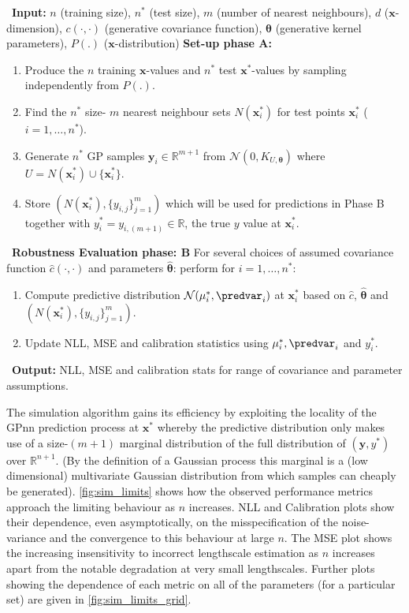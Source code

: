   \begin{algorithm}[ht]
     \,\,\,\textbf{Input:} $n$ (training size), $n^*$ (test size), $m$ (number of nearest neighbours), $d$ ($\bm{x}$-dimension), $c(\cdot,\cdot)$ (generative covariance function), $\bm{\theta}$ (generative kernel parameters), $P(.)$ ($\bm{x}$-distribution) 
     \newline
     \textbf{Set-up phase A:}
     \begin{enumerate}
       \item Produce the $n$ training $\bm{x}$-values and $n^*$ test $\bm{x}^*$-values by sampling independently from $P(.)$.
       \item Find the $n^*$ size- $m$ nearest neighbour sets $N(\bm{x}_i^*)$ for test points $\bm{x}_i^*$ ($i = 1,\dots,n^*$).
       \item Generate $n^*$ GP samples $\bm{y}_i \in \mathbb{R}^{m+1}$ from $\mathcal{N}(0,K_{U,\bm{\theta}})$ where
       $U = N(\bm{x}_i^*) \cup \{\bm{x}_i^*\}$.
       \item Store $(N(\bm{x}_i^*),\{y_{i,j}\}_{j=1}^m)$ which will be used for predictions in Phase B together with $y_i^* = y_{i,(m+1)} \in \mathbb{R}$, the true $y$ value at $\bm{x}_i^*$.
     \end{enumerate}
     \,\,\,\textbf{Robustness Evaluation phase: B}
     \newline
     For several choices of assumed covariance function $\hat{c}(\cdot,\cdot)$ and parameters $\hat{\bm{\theta}}$: perform for $i=1,\dots,n^*$:
     \begin{enumerate}
       \item Compute predictive distribution $\mathcal{N}(\mu_i^*,\predvar_i)$ at $\bm{x}_i^*$ based on $\hat{c}$, $\hat{\bm{\theta}}$ and $(N(\bm{x}_i^*),\{y_{i,j}\}_{j=1}^m)$.
      \item Update NLL, MSE and calibration statistics using $\mu_i^*,\predvar_i$ and $y_i^*$.
     \end{enumerate}
     \,\,\,\textbf{Output:} NLL, MSE and calibration stats for range of covariance and parameter assumptions. 
     \caption{Simulation of GPnn Robustness and Limiting Behaviour}
     \label{alg:NNGP_robust_sim}
   \end{algorithm}
The simulation algorithm gains its efficiency by exploiting the locality of the GPnn prediction process at $\bm{x}^*$ whereby the predictive distribution only makes use of a size-$(m+1)$ marginal distribution of the full distribution of $(\bm{y},y^*)$ over $\mathbb{R}^{n+1}$. (By the definition of a Gaussian process this marginal is a (low dimensional) multivariate Gaussian distribution from which samples can cheaply be generated). \autoref{fig:sim_limits} shows how the observed performance metrics approach the limiting behaviour as \(n\) increases. NLL and Calibration plots show their dependence, even asymptotically, on the misspecification of the noise-variance and the convergence to this behaviour at large \(n\). The MSE plot shows the increasing insensitivity to incorrect lengthscale estimation as \(n\) increases apart from the notable degradation at very small lengthscales. Further plots showing the dependence of each metric on all of the parameters (for a particular set) are given in \autoref{fig:sim_limits_grid}.
  

